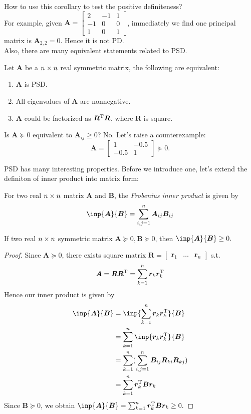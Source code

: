 How to use this corollary to test the positive definiteness?\\
For example, given $\bm A=\begin{bmatrix}
2&-1&1\\-1&0&0\\1&0&1
\end{bmatrix}$, immediately we find one principal matrix is $\bm A_{2,2}=0.$ Hence it is not PD.\\
Also, there are many equivalent statements related to PSD.
\begin{theorem}
Let $\bm A$ be a $n\times n$ real symmetric matrix, the following are equivalent:
\begin{enumerate}
\item
$\bm A$ is PSD.
\item
All eigenvalues of $\bm A$ are nonnegative.
\item
$\bm A$ could be factorized as $\bm R^{\mathrm T}\bm R$, where $\bm R$ is square.
\end{enumerate}
\end{theorem}
\begin{remark}
Is $\bm A\succeq0$ equivalent to $\bm A_{ij}\ge0$? No. Let's raise a counterexample:
\[
\bm A=\begin{bmatrix}
1&-0.5\\-0.5&1
\end{bmatrix}\succeq0.
\]
\end{remark}
PSD has many interesting properties. Before we introduce one, let's extend the definiton of inner product into matrix form:
\begin{definition}
For two real $n\times n$ matrix $\bm A$ and $\bm B$, the \emph{Frobenius inner product} is given by
\[
\inp{\bm A}{\bm B}=\sum_{i,j=1}^{n}\bm A_{ij}\bm B_{ij}
\]
\end{definition}
\begin{proposition}
If two real $n\times n$ symmetric matrix $\bm A\succeq0,\bm B\succeq0$, then $\inp{\bm A}{\bm B}\ge0.$
\end{proposition}
\begin{proof}
Since $\bm A\succeq0$, there exists square matrix $\bm R=\begin{bmatrix}
\bm r_1&\dots&\bm r_n
\end{bmatrix}$ s.t.
\[
\bm A=\bm R\bm R^{\mathrm T}=\sum_{k=1}^{n}\bm r_k\bm r_k^{\mathrm T}
\]
Hence our inner product is given by
\begin{align*}
\inp{\bm A}{\bm B}&=\inp{\sum_{k=1}^{n}\bm r_k\bm r_k\trans}{\bm B}\\
&=\sum_{k=1}^{n}\inp{\bm r_k\bm r_k\trans}{\bm B}\\
&=\sum_{k=1}^{n}(\sum_{i,j=1}^{n}\bm B_{ij}\bm R_{ki}\bm R_{kj})\\
&=\sum_{k=1}^{n}\bm r_k\trans\bm B\bm r_k
\end{align*}
Since $\bm B\succeq0$, we obtain $\inp{\bm A}{\bm B}=\sum_{k=1}^{n}\bm r_k\trans\bm B\bm r_k\ge0.$
\end{proof}